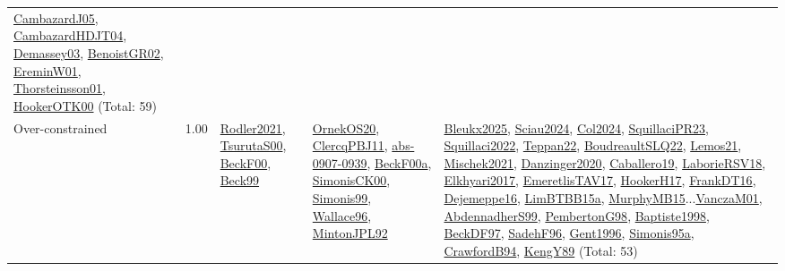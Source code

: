 {\begin{longtable}{p{3cm}r>{\raggedright\arraybackslash}p{6cm}>{\raggedright\arraybackslash}p{6cm}>{\raggedright\arraybackslash}p{8cm}}
\hyperref[detail:CambazardJ05]{CambazardJ05}, \hyperref[detail:CambazardHDJT04]{CambazardHDJT04}, \hyperref[detail:Demassey03]{Demassey03}, \hyperref[detail:BenoistGR02]{BenoistGR02}, \hyperref[detail:EreminW01]{EreminW01}, \hyperref[detail:Thorsteinsson01]{Thorsteinsson01}, \hyperref[detail:HookerOTK00]{HookerOTK00} (Total: 59)\\
\index{Over-constrained}\index{Concepts!Over-constrained}Over-constrained &  1.00 & \hyperref[detail:Rodler2021]{Rodler2021}, \hyperref[detail:TsurutaS00]{TsurutaS00}, \hyperref[detail:BeckF00]{BeckF00}, \hyperref[detail:Beck99]{Beck99} & \hyperref[detail:OrnekOS20]{OrnekOS20}, \hyperref[detail:ClercqPBJ11]{ClercqPBJ11}, \hyperref[detail:abs-0907-0939]{abs-0907-0939}, \hyperref[detail:BeckF00a]{BeckF00a}, \hyperref[detail:SimonisCK00]{SimonisCK00}, \hyperref[detail:Simonis99]{Simonis99}, \hyperref[detail:Wallace96]{Wallace96}, \hyperref[detail:MintonJPL92]{MintonJPL92} & \hyperref[detail:Bleukx2025]{Bleukx2025}, \hyperref[detail:Sciau2024]{Sciau2024}, \hyperref[detail:Col2024]{Col2024}, \hyperref[detail:SquillaciPR23]{SquillaciPR23}, \hyperref[detail:Squillaci2022]{Squillaci2022}, \hyperref[detail:Teppan22]{Teppan22}, \hyperref[detail:BoudreaultSLQ22]{BoudreaultSLQ22}, \hyperref[detail:Lemos21]{Lemos21}, \hyperref[detail:Mischek2021]{Mischek2021}, \hyperref[detail:Danzinger2020]{Danzinger2020}, \hyperref[detail:Caballero19]{Caballero19}, \hyperref[detail:LaborieRSV18]{LaborieRSV18}, \hyperref[detail:Elkhyari2017]{Elkhyari2017}, \hyperref[detail:EmeretlisTAV17]{EmeretlisTAV17}, \hyperref[detail:HookerH17]{HookerH17}, \hyperref[detail:FrankDT16]{FrankDT16}, \hyperref[detail:Dejemeppe16]{Dejemeppe16}, \hyperref[detail:LimBTBB15a]{LimBTBB15a}, \hyperref[detail:MurphyMB15]{MurphyMB15}...\hyperref[detail:VanczaM01]{VanczaM01}, \hyperref[detail:AbdennadherS99]{AbdennadherS99}, \hyperref[detail:PembertonG98]{PembertonG98}, \hyperref[detail:Baptiste1998]{Baptiste1998}, \hyperref[detail:BeckDF97]{BeckDF97}, \hyperref[detail:SadehF96]{SadehF96}, \hyperref[detail:Gent1996]{Gent1996}, \hyperref[detail:Simonis95a]{Simonis95a}, \hyperref[detail:CrawfordB94]{CrawfordB94}, \hyperref[detail:KengY89]{KengY89} (Total: 53)\\

\end{longtable}}

